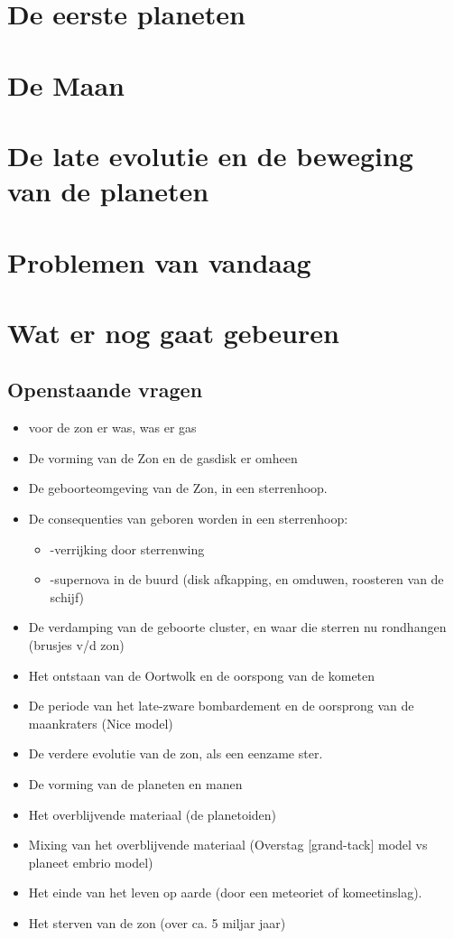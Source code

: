 \documentclass[11pt,fleqn]{book} %
\begin{document}
\chapter{De eerste planeten}
\chapter{De Maan}
\chapter{De late evolutie en de beweging van de planeten}
\chapter{Problemen van vandaag}
\chapter{Wat er nog gaat gebeuren}

\section{Openstaande vragen}

   
\begin{itemize} 
\item voor de zon er was, was er gas
\item De vorming van de Zon en de gasdisk er omheen
\item De geboorteomgeving van de Zon, in een sterrenhoop.
\item De consequenties van geboren worden in een sterrenhoop:
  \begin{itemize} 
  \item    -verrijking door sterrenwing
  \item    -supernova in de buurd (disk afkapping, en omduwen, roosteren van de schijf)
  \end{itemize} 
\item De verdamping van de geboorte cluster, en waar die sterren nu rondhangen (brusjes v/d zon)
\item Het ontstaan van de Oortwolk en de oorspong van de kometen
\item De periode van het late-zware bombardement en de oorsprong van de maankraters (Nice model)
\item De verdere evolutie van de zon, als een eenzame ster.
\item De vorming van de planeten en manen
\item Het overblijvende materiaal (de planetoiden)
\item Mixing van het overblijvende materiaal (Overstag [grand-tack] model vs planeet embrio model)
\item Het einde van het leven op aarde (door een meteoriet of komeetinslag).
\item Het sterven van de zon (over ca. 5 miljar jaar)
\end{itemize}
\end{document}
